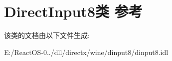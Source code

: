 \hypertarget{class_direct_input8}{}\section{Direct\+Input8类 参考}
\label{class_direct_input8}


该类的文档由以下文件生成\+:\begin{DoxyCompactItemize}
\item 
E\+:/\+React\+O\+S-\/0../dll/directx/wine/dinput8/dinput8.\+idl\end{DoxyCompactItemize}
